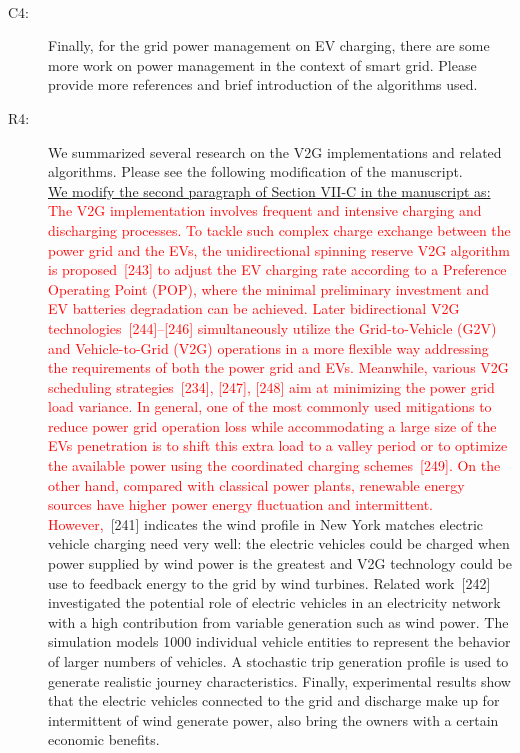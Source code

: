 \documentclass[onecolumn]{IEEEconf}
\begin{document}
\begin{description}
~\\

\item [C4: ] Finally, for the grid power management on EV charging, there are some more work on power management in the context of smart grid. Please provide more references and brief introduction of the algorithms used.
\item [R4: ] We summarized several research on the V2G implementations and related algorithms. Please see the following modification of the manuscript.\\

\underline{We modify the second paragraph of Section VII-C in the manuscript as:}\\
\textcolor{red}{The V2G implementation involves frequent and intensive charging and discharging processes. To tackle such complex charge exchange between the power grid and the EVs, the unidirectional spinning reserve V2G algorithm is proposed~[243] to adjust the EV charging rate according to a Preference Operating Point (POP), where the minimal preliminary investment and EV batteries degradation can be achieved.  Later bidirectional V2G technologies~[244]--[246] simultaneously utilize the Grid-to-Vehicle (G2V) and Vehicle-to-Grid (V2G) operations in a more flexible way addressing the requirements of both the power grid and EVs. Meanwhile, various V2G scheduling strategies~[234], [247], [248] aim at minimizing the power grid load variance. In general, one of the most commonly used mitigations to reduce power grid operation loss while accommodating a large size of the EVs penetration is to shift this extra load to a valley period or to optimize the available power using the coordinated charging schemes~[249]. On the other hand, 
compared with classical power plants, renewable energy sources have higher power energy fluctuation and intermittent. However,}~[241] indicates the wind profile in New York matches electric vehicle charging need very well: the electric vehicles could be charged when power supplied by wind power is the greatest and V2G technology could be use to feedback energy to the grid by wind turbines.
Related work~[242] investigated the potential role of electric vehicles in an electricity network with a high contribution from variable generation such as wind power. The simulation models 1000 individual vehicle entities to represent the behavior of larger numbers of vehicles. 
A stochastic trip generation profile is used to generate realistic journey characteristics. 
Finally, experimental results show that the electric vehicles connected to the grid and discharge make up for intermittent of wind generate power, also bring the owners with a certain economic benefits.
\\
\end{description}
\end{document}
